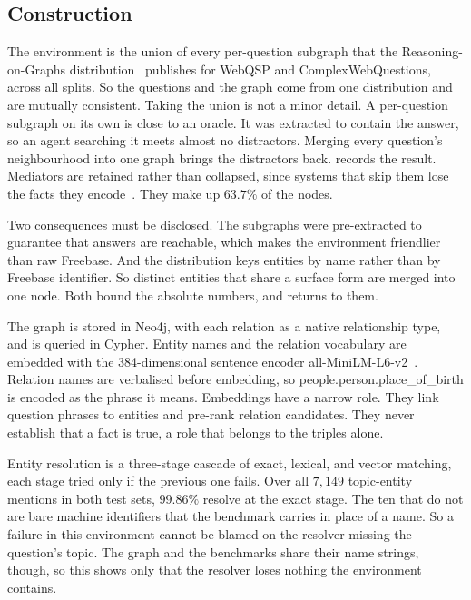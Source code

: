 \subsection{Construction}

The environment is the union of every per-question subgraph that the
Reasoning-on-Graphs distribution~\cite{luo2024reasoning} publishes for WebQSP
and ComplexWebQuestions, across all splits. So the questions and the graph come
from one distribution and are mutually consistent. Taking the union is not a
minor detail. A per-question subgraph on its own is close to an oracle. It was
extracted to contain the answer, so an agent searching it meets almost no
distractors. Merging every question's neighbourhood into one graph brings the
distractors back.  records the result. Mediators are
retained rather than collapsed, since systems that skip them lose the facts they
encode~\cite{xu2024generate}. They make up $63.7\%$ of the nodes.

Two consequences must be disclosed. The subgraphs were pre-extracted to
guarantee that answers are reachable, which makes the environment friendlier
than raw Freebase. And the distribution keys entities by name rather than by
Freebase identifier. So distinct entities that share a surface form are merged
into one node. Both bound the absolute numbers, and  returns
to them.

The graph is stored in Neo4j, with each relation as a native relationship type,
and is queried in Cypher. Entity names and the relation vocabulary are embedded
with the 384-dimensional sentence encoder
all-MiniLM-L6-v2~\cite{reimers2019sentence}. Relation names are verbalised
before embedding, so \textsf{people.person.place\_of\_birth} is encoded as the
phrase it means. Embeddings have a narrow role. They link question phrases to
entities and pre-rank relation candidates. They never establish that a fact is
true, a role that belongs to the triples alone.

Entity resolution is a three-stage cascade of exact, lexical, and vector
matching, each stage tried only if the previous one fails. Over all $7{,}149$
topic-entity mentions in both test sets, $99.86\%$ resolve at the exact stage.
The ten that do not are bare machine identifiers that the benchmark carries in
place of a name. So a failure in this environment cannot be blamed on the
resolver missing the question's topic. The graph and the benchmarks share their
name strings, though, so this shows only that the resolver loses nothing the
environment contains.

